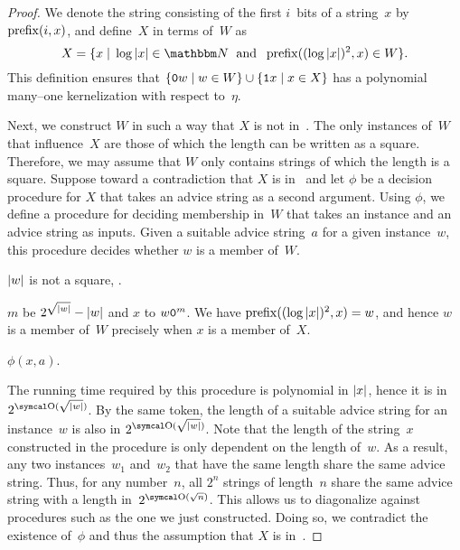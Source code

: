 \begin{proof}
  We denote the string consisting of the first $i$~bits of a string~$x$ by $\operatorname{prefix}(i, x)$, and define~$X$ in terms of~$W$ as
  \begin{equation*}
    X \deq \{x \st \log\length{x} \in \bbN \reland \prefix((\log\length{x})^2, x) \in W\}.
  \end{equation*}
  This definition ensures that $\{\textnormal{\texttt{0}}w \;|\; w \in W\} \cup \{\textnormal{\texttt{1}}x \;|\; x \in X\}$ has a polynomial many--one kernelization with respect to~$\eta$.

  Next, we construct $W$ in such a way that $X$ is not in~.
  The only instances of~$W$ that influence~$X$ are those of which the length can be written as a square.
  Therefore, we may assume that $W$ only contains strings of which the length is a square.
  Suppose toward a contradiction that $X$ is in~ and let $\phi$ be a decision procedure for $X$ that takes an advice string as a second argument.
  Using $\phi$, we define a procedure for deciding membership in~$W$ that takes an instance and an advice string as inputs.
  Given a suitable advice string~$a$ for a given instance~$w$, this procedure decides whether $w$ is a member of~$W$.
  \begin{codelisting}
  \item
     $\length{w}$ is not a square,  .
  \item
     $m$ be $2^{\sqrt{\length{w}}} - \length{w}$ and  $x$ to $w\bits{0}^m$.
    We have $\prefix((\log\length{x})^2, x) = w$, and hence $w$ is a member of~$W$ precisely when $x$ is a member of~$X$.
  \item
     $\phi(x, a)$.
  \end{codelisting}
  The running time required by this procedure is polynomial in ${\lvert x\rvert}$, hence it is in $2^{\bigO(\sqrt{\length{w}})}$.
  By the same token, the length of a suitable advice string for an instance~$w$ is also in $2^{\bigO(\sqrt{\length{w}})}$.
  Note that the length of the string~$x$ constructed in the procedure is only dependent on the length of~$w$.
  As a result, any two instances~$w_1$ and~$w_2$ that have the same length share the same advice string.
  Thus, for any number~$n$, all $2^n$ strings of length~$n$ share the same advice string with a length in~$2^{\bigO(\sqrt{n})}$.
  This allows us to diagonalize against procedures such as the one we just constructed.
  Doing so, we contradict the existence of~$\phi$ and thus the assumption that $X$ is in~.


\end{proof}
